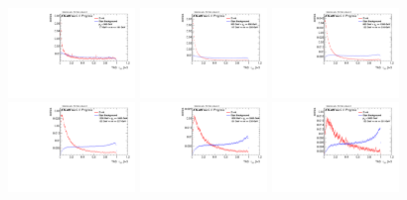 \begin{figure}[H]
\includegraphics[width=0.3\textwidth]{sascha_input/Appendix/Distributions/top/distributions/beta3/h_assisted_tj_nSub32_3_bin1.pdf} \hspace{1mm}
\includegraphics[width=0.3\textwidth]{sascha_input/Appendix/Distributions/top/distributions/beta3/h_assisted_tj_nSub32_3_bin2.pdf} \hspace{1mm}
\includegraphics[width=0.3\textwidth]{sascha_input/Appendix/Distributions/top/distributions/beta3/h_assisted_tj_nSub32_3_bin3.pdf} 
\bigskip
\includegraphics[width=0.3\textwidth]{sascha_input/Appendix/Distributions/top/distributions/beta3/h_assisted_tj_nSub32_3_bin4.pdf} \hspace{1mm}
\includegraphics[width=0.3\textwidth]{sascha_input/Appendix/Distributions/top/distributions/beta3/h_assisted_tj_nSub32_3_bin5.pdf} \hspace{1mm}
\includegraphics[width=0.3\textwidth]{sascha_input/Appendix/Distributions/top/distributions/beta3/h_assisted_tj_nSub32_3_bin6.pdf} 

\end{figure}
